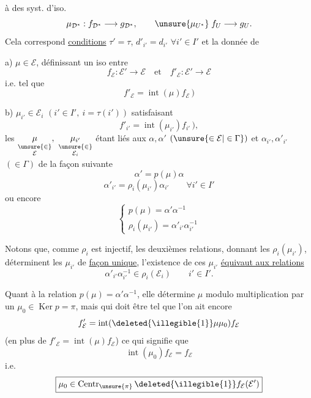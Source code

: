 
 à des syst. d'iso.
\[
\mu_{\mathcal D^*}:f_{\mathcal D^*}\longrightarrow g_{\mathcal D^*},\qquad
\unsure{\mu_{U^*}}\;f_U\longrightarrow g_U.
\]
Cela correspond \uline{conditions} $\tau'=\tau$, $d'_{i'}=d_{i'}$ $\forall i'\in I'$ et la donnée de

a) $\boxed{\boxed{\mu\in\mathcal E}}$, définissant un iso entre
\[
f_{\mathcal E}:\mathcal E'\longrightarrow\mathcal E
\quad\text{et}\quad
f'_{\mathcal E}:\mathcal E'\longrightarrow\mathcal E
\]
i.e.  tel que
\[
\boxed{f'_{\mathcal E}=\operatorname{int}(\mu)f_{\mathcal E}}\,)
\]

b) $\boxed{\boxed{\mu_{i'}\in\mathcal E_i}}$ $(i'\in I',\ i=\tau(i'))$
satisfaisant
\[
\boxed{f'_{i'}=\operatorname{int}(\mu_{i'})f_{i'}}\,),
\]
les $\underset{\substack{\unsure{\in}\\\mathcal E}}{\mu},\ \underset{\substack{\unsure{\in}\\\mathcal E_i}}{\mu_{i'}}$ étant liés aux $\alpha,\alpha'$  $(\unsure{\in\mathcal E|\in\Gamma})$
et $\alpha_{i'},\alpha'_{i'}$ $(\in\Gamma)$ de la façon suivante
\[
\boxed{\alpha'=p(\mu)\alpha}
\]
\[
\boxed{\alpha'_{i'}=\rho_i(\mu_{i'})\alpha_{i'}}\qquad\forall i'\in I'
\]
ou encore
\[
\boxed{\begin{cases}
p(\mu)=\alpha'\alpha^{-1}\\
\rho_i(\mu_{i'})=\alpha'_{i'}\alpha_{i'}^{-1}
\end{cases}}
\]

Notons que, comme $\rho_i$ est injectif, les deuxièmes relations, donnant les $\rho_i(\mu_{i'})$, déterminent les $\mu_{i'}$ de \uline{façon unique}, l'existence de ces $\mu_{i'}$ \uline{équivaut aux relations}
\[
\boxed{\alpha'_{i'}\alpha_{i'}^{-1}\in\rho_i(\mathcal E_i)}\qquad i'\in I'.
\]

Quant à la relation $p(\mu)=\alpha'\alpha^{-1}$, elle détermine $\mu$ modulo multiplication  par un  $\mu_0\in\operatorname{Ker}p=\pi$, mais qui doit être tel que l'on ait encore
\[
f'_{\mathcal E}=\operatorname{int}(\deleted{\illegible{1}}\mu\mu_0)f_{\mathcal E}
\]
(en plus de $f'_{\mathcal E}=\operatorname{int}(\mu)f_{\mathcal E}$) ce qui signifie  que
\[
\operatorname{int}(\mu_0)f_{\mathcal E}=f_{\mathcal E}
\]
i.e.
\[
\boxed{\mu_0\in\operatorname{Centr}_{\unsure{\pi}}\deleted{\illegible{1}}f_{\mathcal E}(\mathcal E')}
\]

